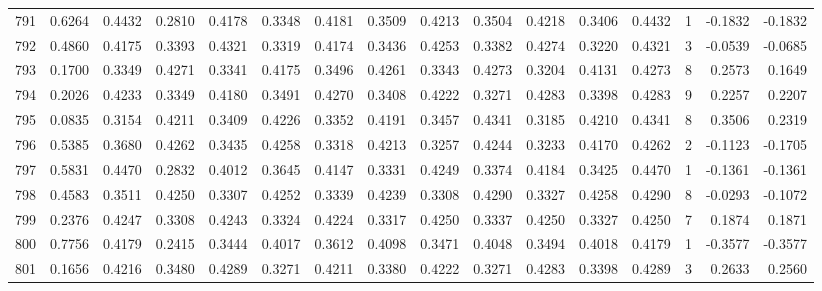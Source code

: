 \begin{tabular}{lrrrrrrrrrrrrrrr}
791 &      0.6264 &  0.4432 &  0.2810 &  0.4178 &  0.3348 &  0.4181 &  0.3509 &  0.4213 &  0.3504 &  0.4218 &   0.3406 &     0.4432 &      1 &                   -0.1832 &                    -0.1832 \\
792 &      0.4860 &  0.4175 &  0.3393 &  0.4321 &  0.3319 &  0.4174 &  0.3436 &  0.4253 &  0.3382 &  0.4274 &   0.3220 &     0.4321 &      3 &                   -0.0539 &                    -0.0685 \\
793 &      0.1700 &  0.3349 &  0.4271 &  0.3341 &  0.4175 &  0.3496 &  0.4261 &  0.3343 &  0.4273 &  0.3204 &   0.4131 &     0.4273 &      8 &                    0.2573 &                     0.1649 \\
794 &      0.2026 &  0.4233 &  0.3349 &  0.4180 &  0.3491 &  0.4270 &  0.3408 &  0.4222 &  0.3271 &  0.4283 &   0.3398 &     0.4283 &      9 &                    0.2257 &                     0.2207 \\
795 &      0.0835 &  0.3154 &  0.4211 &  0.3409 &  0.4226 &  0.3352 &  0.4191 &  0.3457 &  0.4341 &  0.3185 &   0.4210 &     0.4341 &      8 &                    0.3506 &                     0.2319 \\
796 &      0.5385 &  0.3680 &  0.4262 &  0.3435 &  0.4258 &  0.3318 &  0.4213 &  0.3257 &  0.4244 &  0.3233 &   0.4170 &     0.4262 &      2 &                   -0.1123 &                    -0.1705 \\
797 &      0.5831 &  0.4470 &  0.2832 &  0.4012 &  0.3645 &  0.4147 &  0.3331 &  0.4249 &  0.3374 &  0.4184 &   0.3425 &     0.4470 &      1 &                   -0.1361 &                    -0.1361 \\
798 &      0.4583 &  0.3511 &  0.4250 &  0.3307 &  0.4252 &  0.3339 &  0.4239 &  0.3308 &  0.4290 &  0.3327 &   0.4258 &     0.4290 &      8 &                   -0.0293 &                    -0.1072 \\
799 &      0.2376 &  0.4247 &  0.3308 &  0.4243 &  0.3324 &  0.4224 &  0.3317 &  0.4250 &  0.3337 &  0.4250 &   0.3327 &     0.4250 &      7 &                    0.1874 &                     0.1871 \\
800 &      0.7756 &  0.4179 &  0.2415 &  0.3444 &  0.4017 &  0.3612 &  0.4098 &  0.3471 &  0.4048 &  0.3494 &   0.4018 &     0.4179 &      1 &                   -0.3577 &                    -0.3577 \\
801 &      0.1656 &  0.4216 &  0.3480 &  0.4289 &  0.3271 &  0.4211 &  0.3380 &  0.4222 &  0.3271 &  0.4283 &   0.3398 &     0.4289 &      3 &                    0.2633 &                     0.2560 \\

\end{tabular}
